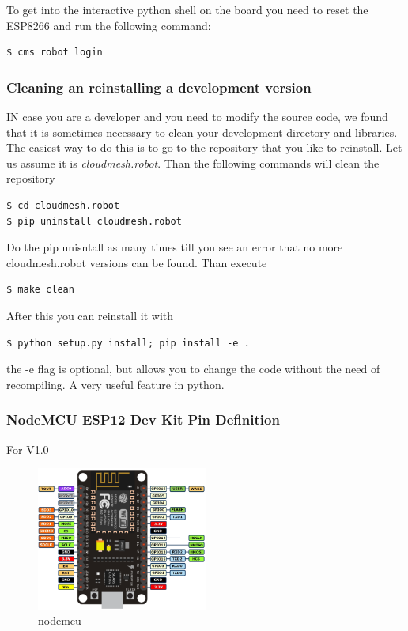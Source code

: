 To get into the interactive python shell on the board you need to reset
the ESP8266 and run the following command:

\begin{verbatim}
$ cms robot login
\end{verbatim}

\subsubsection{Cleaning an reinstalling a development
version}\label{cleaning-an-reinstalling-a-development-version}

IN case you are a developer and you need to modify the source code, we
found that it is sometimes necessary to clean your development directory
and libraries. The easiest way to do this is to go to the repository
that you like to reinstall. Let us assume it is \emph{cloudmesh.robot}.
Than the following commands will clean the repository

\begin{verbatim}
$ cd cloudmesh.robot
$ pip uninstall cloudmesh.robot
\end{verbatim}

Do the pip unisntall as many times till you see an error that no more
cloudmesh.robot versions can be found. Than execute

\begin{verbatim}
$ make clean
\end{verbatim}

After this you can reinstall it with

\begin{verbatim}
$ python setup.py install; pip install -e .
\end{verbatim}

the -e flag is optional, but allows you to change the code without the
need of recompiling. A very useful feature in python.

\subsubsection{NodeMCU ESP12 Dev Kit Pin
Definition}\label{nodemcu-esp12-dev-kit-pin-definition}

For V1.0

\begin{figure}
\centering
\includegraphics[width=0.5\textwidth]{images/nodemcu.png}
\caption{nodemcu}
\end{figure}


